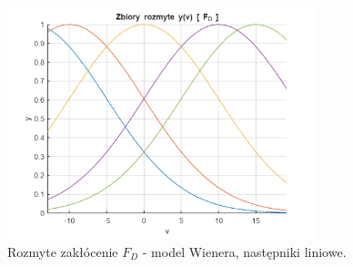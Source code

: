 \begin{figure}[h!]
\centering
\includegraphics[width=0.8\textwidth]{pictures/fuzzy_wien_fd_lin}
\caption{Rozmyte zakłócenie $F_D$ - model Wienera, następniki liniowe.}
\end{figure}

